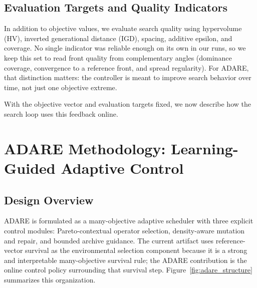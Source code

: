 \documentclass[runningheads]{llncs}
\begin{document}
\subsection{Evaluation Targets and Quality Indicators}
In addition to objective values, we evaluate search quality using hypervolume (HV), inverted generational distance (IGD), spacing, additive epsilon, and coverage. No single indicator was reliable enough on its own in our runs, so we keep this set to read front quality from complementary angles (dominance coverage, convergence to a reference front, and spread regularity). For ADARE, that distinction matters: the controller is meant to improve search behavior over time, not just one objective extreme.

With the objective vector and evaluation targets fixed, we now describe how the search loop uses this feedback online.

\section{ADARE Methodology: Learning-Guided Adaptive Control}
\subsection{Design Overview}
ADARE is formulated as a many-objective adaptive scheduler with three explicit control modules: Pareto-contextual operator selection, density-aware mutation and repair, and bounded archive guidance. The current artifact uses reference-vector survival as the environmental selection component because it is a strong and interpretable many-objective survival rule; the ADARE contribution is the online control policy surrounding that survival step. Figure~\ref{fig:adare_structure} summarizes this organization.
\end{document}
